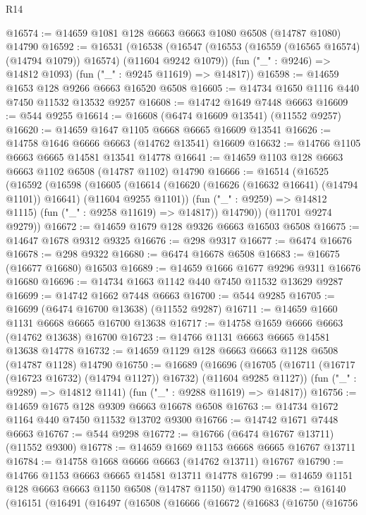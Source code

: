 \begin{lexlean}{R14}
\begin{coremodule}
{{{{{{{{{{{{{{{{{{{{{{{{{{{{{{{{{{{{{{{{{{{{{{{{{{{{{{{{{{{{{{{{{{{{{{{{{{{{{{{{{{@16574 := @14659 @1081 @128 @6663 @6663 @1080 @6508 (@14787 @1080) @14790
@16592 := @16531
    (@16538
      (@16547 (@16553 (@16559 (@16565 @16574) (@14794 @1079)) @16574) (@11604 @9242 @1079))
      (fun ("_" : @9246) => @14812 @1093)
      (fun ("_" : @9245 @11619) => @14817))
@16598 := @14659 @1653 @128 @9266 @6663 @16520 @6508
@16605 := @14734 @1650 @1116 @440 @7450 @11532 @13532 @9257
@16608 := @14742 @1649 @7448 @6663
@16609 := @544 @9255
@16614 := @16608 (@6474 @16609 @13541) (@11552 @9257)
@16620 := @14659 @1647 @1105 @6668 @6665 @16609 @13541
@16626 := @14758 @1646 @6666 @6663 (@14762 @13541) @16609
@16632 := @14766 @1105 @6663 @6665 @14581 @13541 @14778
@16641 := @14659 @1103 @128 @6663 @6663 @1102 @6508 (@14787 @1102) @14790
@16666 := @16514
    (@16525
      (@16592
        (@16598
          (@16605
            (@16614 (@16620 (@16626 (@16632 @16641) (@14794 @1101)) @16641) (@11604 @9255 @1101))
            (fun ("_" : @9259) => @14812 @1115)
            (fun ("_" : @9258 @11619) => @14817))
          @14790))
      (@11701 @9274 @9279))
@16672 := @14659 @1679 @128 @9326 @6663 @16503 @6508
@16675 := @14647 @1678 @9312 @9325
@16676 := @298 @9317
@16677 := @6474 @16676
@16678 := @298 @9322
@16680 := @6474 @16678 @6508
@16683 := @16675 (@16677 @16680) @16503
@16689 := @14659 @1666 @1677 @9296 @9311 @16676 @16680
@16696 := @14734 @1663 @1142 @440 @7450 @11532 @13629 @9287
@16699 := @14742 @1662 @7448 @6663
@16700 := @544 @9285
@16705 := @16699 (@6474 @16700 @13638) (@11552 @9287)
@16711 := @14659 @1660 @1131 @6668 @6665 @16700 @13638
@16717 := @14758 @1659 @6666 @6663 (@14762 @13638) @16700
@16723 := @14766 @1131 @6663 @6665 @14581 @13638 @14778
@16732 := @14659 @1129 @128 @6663 @6663 @1128 @6508 (@14787 @1128) @14790
@16750 := @16689
    (@16696
      (@16705 (@16711 (@16717 (@16723 @16732) (@14794 @1127)) @16732) (@11604 @9285 @1127))
      (fun ("_" : @9289) => @14812 @1141)
      (fun ("_" : @9288 @11619) => @14817))
@16756 := @14659 @1675 @128 @9309 @6663 @16678 @6508
@16763 := @14734 @1672 @1164 @440 @7450 @11532 @13702 @9300
@16766 := @14742 @1671 @7448 @6663
@16767 := @544 @9298
@16772 := @16766 (@6474 @16767 @13711) (@11552 @9300)
@16778 := @14659 @1669 @1153 @6668 @6665 @16767 @13711
@16784 := @14758 @1668 @6666 @6663 (@14762 @13711) @16767
@16790 := @14766 @1153 @6663 @6665 @14581 @13711 @14778
@16799 := @14659 @1151 @128 @6663 @6663 @1150 @6508 (@14787 @1150) @14790
@16838 := @16140
    (@16151
      (@16491
        (@16497
          (@16508
            (@16666
              (@16672
                (@16683
                  (@16750
                    (@16756
}}}}}}}}}}}}}}}}}}}}}}}}}}}}}}}}}}}}}}}}}}}}}}}}}}}}}}}}}}}}}}}}}}}}}}}}}}}}}}}}}}
\end{coremodule}
\end{lexlean}
